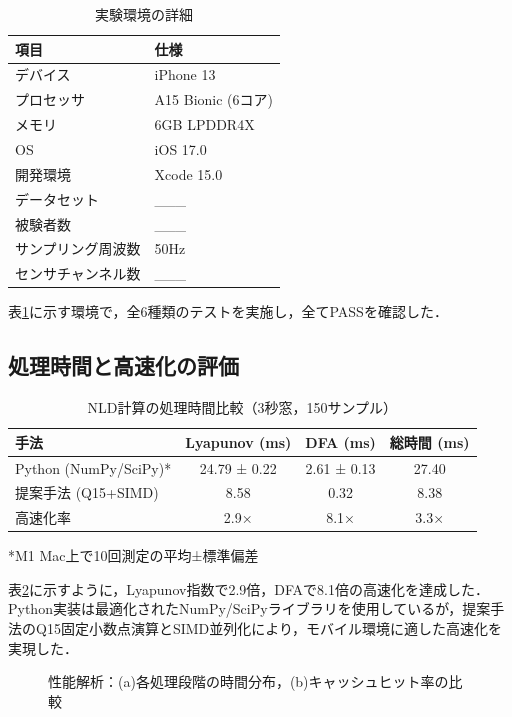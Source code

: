 \documentclass[paper]{ieice}
\begin{document}
\begin{table}[t]
\caption{実験環境の詳細}
\label{tab:environment}
\centering
\begin{tabular}{ll}
\toprule
項目 & 仕様 \\
\midrule
デバイス & iPhone 13 \\
プロセッサ & A15 Bionic (6コア) \\
メモリ & 6GB LPDDR4X \\
OS & iOS 17.0 \\
開発環境 & Xcode 15.0 \\
データセット & ___ \\
被験者数 & ___ \\
サンプリング周波数 & 50Hz \\
センサチャンネル数 & ___ \\
\bottomrule
\end{tabular}
\end{table}

表\ref{tab:environment}に示す環境で，全6種類のテストを実施し，全てPASSを確認した．

\subsection{処理時間と高速化の評価}

\begin{table}[t]
\caption{NLD計算の処理時間比較（3秒窓，150サンプル）}
\label{tab:performance}
\centering
\begin{tabular}{lccc}
\toprule
手法 & Lyapunov (ms) & DFA (ms) & 総時間 (ms) \\
\midrule
Python (NumPy/SciPy)* & 24.79 ± 0.22 & 2.61 ± 0.13 & 27.40 \\
提案手法 (Q15+SIMD) & 8.58 & 0.32 & 8.38 \\
\midrule
高速化率 & 2.9× & 8.1× & 3.3× \\
\bottomrule
\end{tabular}
\vspace{1mm}
\footnotesize{*M1 Mac上で10回測定の平均±標準偏差}
\end{table}

表\ref{tab:performance}に示すように，Lyapunov指数で2.9倍，DFAで8.1倍の高速化を達成した．Python実装は最適化されたNumPy/SciPyライブラリを使用しているが，提案手法のQ15固定小数点演算とSIMD並列化により，モバイル環境に適した高速化を実現した．

\begin{figure}[t]
\centering
{}
\caption{性能解析：(a)各処理段階の時間分布，(b)キャッシュヒット率の比較}
\label{fig:performance_analysis}
\end{figure}
\end{document}
